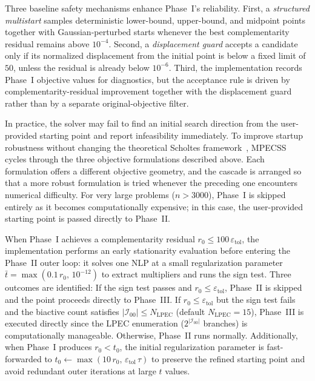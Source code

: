 Three baseline safety mechanisms enhance Phase~I's reliability. First,
a \textit{structured multistart} samples deterministic lower-bound,
upper-bound, and midpoint points together with Gaussian-perturbed
starts whenever the best complementarity residual remains above
$10^{-4}$. Second, a \textit{displacement guard} accepts a candidate
only if its normalized displacement from the initial point is below a
fixed limit of $50$, unless the residual is already below $10^{-6}$.
Third, the implementation records Phase~I objective values for
diagnostics, but the acceptance rule is driven by complementarity-residual
improvement together with the displacement guard rather than by a
separate original-objective filter.

In practice, the solver may fail to find an initial search direction from the user-provided starting point and report infeasibility immediately. To improve startup robustness without changing the theoretical Scholtes framework~\cite{Scholtes2001}, MPECSS cycles through the three objective formulations described above. Each formulation offers a different objective geometry, and the cascade is arranged so that a more robust formulation is tried whenever the preceding one encounters numerical difficulty. For very large problems ($n > 3000$), Phase~I is skipped entirely as it becomes computationally expensive; in this case, the user-provided starting point is passed directly to Phase~II.

When Phase~I achieves a complementarity residual $r_0 \leq 100\,
\varepsilon_{\mathrm{tol}}$, the implementation performs an early
stationarity evaluation before entering the Phase~II outer loop: it
solves one NLP at a small regularization parameter
$\bar{t} = \max(0.1\,r_0,\, 10^{-12})$ to extract multipliers and runs
the sign test.  Three outcomes are identified:
If the sign test passes and $r_0 \leq \varepsilon_{\mathrm{tol}}$,
Phase~II is skipped and the point proceeds directly to Phase~III.
If $r_0 \leq \varepsilon_{\mathrm{tol}}$ but the sign test fails
and the biactive count satisfies
$|\mathcal{I}_{00}| \leq N_{\mathrm{LPEC}}$ (default $N_{\mathrm{LPEC}}=15$),
Phase~III is executed directly since the LPEC enumeration
($2^{|\mathcal{I}_{00}|}$ branches) is computationally manageable.
Otherwise, Phase~II runs normally.
Additionally, when Phase~I produces $r_0 < t_0$, the initial
regularization parameter is fast-forwarded to
$t_0 \gets \max(10\,r_0,\, \varepsilon_{\mathrm{tol}}\,\tau)$ to
preserve the refined starting point and avoid redundant outer
iterations at large $t$ values.

